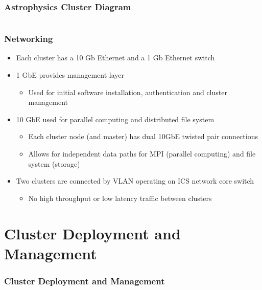 \documentclass[handout]{beamer}
\begin{document}
\begin{frame}[fragile]
\frametitle{Astrophysics Cluster Diagram}
\begin{columns}
\end{columns}
\end{frame}

\begin{frame}
\frametitle{Networking}
\begin{itemize}
\item Each cluster has a 10 Gb Ethernet and a 1 Gb Ethernet switch
\item 1 GbE provides management layer
\begin{itemize}
\item Used for initial software installation, authentication and cluster management
\end{itemize}
\item 10 GbE used for parallel computing and distributed file system
\begin{itemize}
\item Each cluster node (and master) has dual 10GbE twisted pair connections
\item Allows for independent data paths for MPI (parallel computing) and file system (storage)
\end{itemize}
\item Two clusters are connected by VLAN operating on ICS network core switch
\begin{itemize}
\item No high throughput or low latency traffic between clusters
\end{itemize}
\end{itemize}
\end{frame}

\section{Cluster Deployment and Management}

\begin{frame}
\frametitle{Cluster Deployment and Management}
\end{frame}
\end{document}
